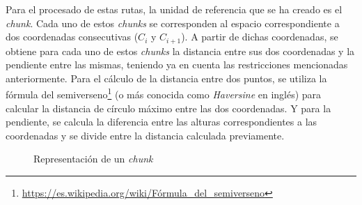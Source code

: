 \documentclass[11pt,spanish,listoffigures,listoftables]{tfgetsinf}
\begin{document}
Para el procesado de estas rutas, la unidad de referencia que se ha creado es el \textit{chunk}. Cada uno de estos \textit{chunks} se corresponden al espacio correspondiente a dos coordenadas consecutivas ($C_{i}$ y $C_{i+1}$). A partir de dichas coordenadas, se obtiene para cada uno de estos \textit{chunks} la distancia entre sus dos coordenadas y la pendiente entre las mismas, teniendo ya en cuenta las restricciones mencionadas anteriormente. Para el cálculo de la distancia entre dos puntos, se utiliza la fórmula del semiverseno\footnote{\url{https://es.wikipedia.org/wiki/Fórmula\_del\_semiverseno} } (o más conocida como \textit{Haversine} en inglés) para calcular la distancia de círculo máximo entre las dos coordenadas. Y para la pendiente, se calcula la diferencia entre las alturas correspondientes a las coordenadas y se divide entre la distancia calculada previamente.

\begin{wrapfigure}{r}{0.5\textwidth}
\caption{Representación de un \textit{chunk}}
\end{wrapfigure}
\end{document}

